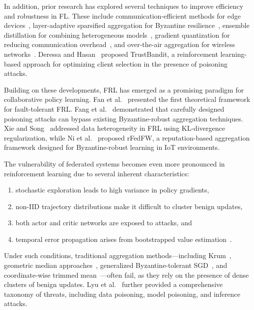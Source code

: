\documentclass[12pt,a4paper]{article}
\begin{document}
In addition, prior research has explored several techniques to improve efficiency and
robustness in FL. These include communication-efficient methods for edge
devices~\cite{ref9}, layer-adaptive sparsified aggregation for Byzantine
resilience~\cite{ref10}, ensemble distillation for combining heterogeneous
models~\cite{ref11}, gradient quantization for reducing communication
overhead~\cite{ref12}, and over-the-air aggregation for wireless
networks~\cite{ref13}. Deressa and Hasan~\cite{ref14} proposed TrustBandit, a
reinforcement learning-based approach for optimizing client selection in the presence
of poisoning attacks.

Building on these developments, FRL has emerged as a promising paradigm for
collaborative policy learning. Fan et al.~\cite{ref15} presented the first theoretical
framework for fault-tolerant FRL. Fang et al.~\cite{ref16} demonstrated that carefully
designed poisoning attacks can bypass existing Byzantine-robust aggregation techniques.
Xie and Song~\cite{ref17} addressed data heterogeneity in FRL using KL-divergence
regularization, while Ni et al.~\cite{ref18} proposed rFedFW, a reputation-based
aggregation framework designed for Byzantine-robust learning in IoT environments.

The vulnerability of federated systems becomes even more pronounced in reinforcement
learning due to several inherent characteristics:
\begin{enumerate}[label=(\roman*)]
  \item stochastic exploration leads to high variance in policy gradients,
  \item non-IID trajectory distributions make it difficult to cluster benign updates,
  \item both actor and critic networks are exposed to attacks, and
  \item temporal error propagation arises from bootstrapped value
        estimation~\cite{ref15,ref17}.
\end{enumerate}

Under such conditions, traditional aggregation methods---including Krum~\cite{ref19},
geometric median approaches~\cite{ref20}, generalized Byzantine-tolerant
SGD~\cite{ref21}, and coordinate-wise trimmed mean~\cite{ref22}---often fail, as they
rely on the presence of dense clusters of benign updates. Lyu et al.~\cite{ref23}
further provided a comprehensive taxonomy of threats, including data poisoning, model
poisoning, and inference attacks.
\end{document}
